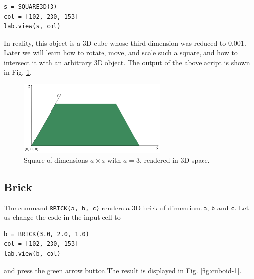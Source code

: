 \begin{bbox}
\begin{verbatim}
s = SQUARE3D(3)
col = [102, 230, 153]
lab.view(s, col)
\end{verbatim}
\end{bbox}
\vspace{6mm}

\noindent
In reality, this object is a 3D cube whose third dimension was reduced
to $0.001$. Later we will learn how to rotate, move, and scale such a square, and how to 
intersect it with an arbitrary 3D object. The output of the above acript 
is shown in Fig. \ref{fig:square-112}.
\newpage
\begin{figure}[!ht]
\begin{center}
\includegraphics[width=0.65\textwidth]{img/square-112.png}
\end{center}
\vspace{-4mm}
\caption{Square of dimensions $a \times a$ with $a = 3$, rendered in 3D space.}
\label{fig:square-112}
\end{figure}
\noindent

\subsection{Brick}

The command {\tt BRICK(a, b, c)} 
renders a 3D brick of dimensions {\tt a}, {\tt b} and {\tt c}. 
Let us change the code in the input cell to  \\

\begin{bbox}
\begin{verbatim}
b = BRICK(3.0, 2.0, 1.0)
col = [102, 230, 153]
lab.view(b, col)
\end{verbatim}
\end{bbox}
\vspace{6mm}

\noindent
and press the green arrow button.The result is displayed in Fig. \ref{fig:cuboid-1}.


